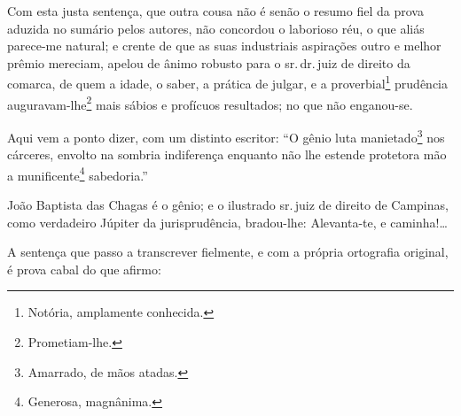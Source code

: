 \asterisc{}

Com esta justa sentença, que outra cousa não é senão o resumo fiel da
prova aduzida no sumário pelos autores, não concordou o laborioso réu, o
que aliás parece-me natural; e crente de que as suas industriais
aspirações outro e melhor prêmio mereciam, apelou de ânimo robusto para
o sr.\,dr.\,juiz de direito da comarca, de quem a idade, o saber, a
prática de julgar, e a proverbial\footnote{ Notória, amplamente
  conhecida.} prudência auguravam-lhe\footnote{ Prometiam-lhe.} mais
sábios e profícuos resultados; no que não enganou-se.

Aqui vem a ponto dizer, com um distinto escritor: ``O gênio luta
manietado\footnote{ Amarrado, de mãos atadas.} nos cárceres, envolto na
sombria indiferença enquanto não lhe estende protetora mão a
munificente\footnote{ Generosa, magnânima.} sabedoria.''

João Baptista das Chagas é o gênio; e o ilustrado sr.\,juiz de direito de
Campinas, como verdadeiro Júpiter da jurisprudência, bradou-lhe:
Alevanta-te, e caminha!\ldots{}

A sentença que passo a transcrever fielmente, e com a própria ortografia
original, é prova cabal do que afirmo:

